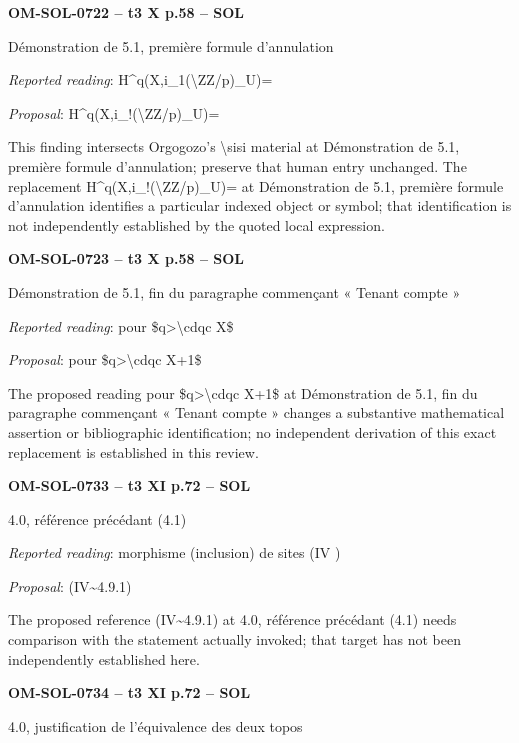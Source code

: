 \par\noindent\textbf{OM-SOL-0722 -- t3 X p.58 -- SOL}\par
Démonstration de 5.1, première formule d'annulation\par
\emph{Reported reading}: H\textasciicircum{}q(X,i\_1(\textbackslash{}ZZ/p)\_U)=\par
\emph{Proposal}: H\textasciicircum{}q(X,i\_!(\textbackslash{}ZZ/p)\_U)=\par
This finding intersects Orgogozo's \textbackslash{}sisi material at Démonstration de 5.1, première formule d'annulation; preserve that human entry unchanged. The replacement H\textasciicircum{}q(X,i\_!(\textbackslash{}ZZ/p)\_U)= at Démonstration de 5.1, première formule d'annulation identifies a particular indexed object or symbol; that identification is not independently established by the quoted local expression.\par
\par\noindent\textbf{OM-SOL-0723 -- t3 X p.58 -- SOL}\par
Démonstration de 5.1, fin du paragraphe commençant « Tenant compte »\par
\emph{Reported reading}: pour \$q>\textbackslash{}cdqc X\$\par
\emph{Proposal}: pour \$q>\textbackslash{}cdqc X+1\$\par
The proposed reading pour \$q>\textbackslash{}cdqc X+1\$ at Démonstration de 5.1, fin du paragraphe commençant « Tenant compte » changes a substantive mathematical assertion or bibliographic identification; no independent derivation of this exact replacement is established in this review.\par
\par\noindent\textbf{OM-SOL-0733 -- t3 XI p.72 -- SOL}\par
4.0, référence précédant (4.1)\par
\emph{Reported reading}: morphisme (inclusion) de sites (IV )\par
\emph{Proposal}: (IV\textasciitilde{}4.9.1)\par
The proposed reference (IV\textasciitilde{}4.9.1) at 4.0, référence précédant (4.1) needs comparison with the statement actually invoked; that target has not been independently established here.\par
\par\noindent\textbf{OM-SOL-0734 -- t3 XI p.72 -- SOL}\par
4.0, justification de l'équivalence des deux topos\par
